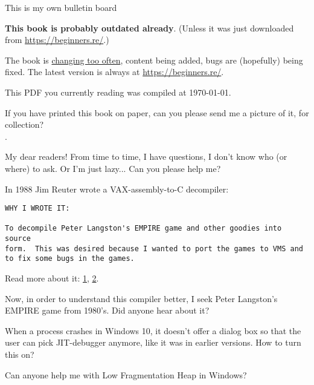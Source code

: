 
\begin{center}
\LARGE{} This is my own bulletin board \normalsize{}
\end{center}

\textbf{This book is probably outdated already}.
(Unless it was just downloaded from \url{https://beginners.re/}.)

The book is \href{\RepoURL/ChangeLog}{changing too often},
content being added, bugs are (hopefully) being fixed.
The latest version is always at \url{https://beginners.re/}.

This PDF you currently reading was compiled at \today{}.

\myhrule{}

If you have printed this book on paper, can you please send me a picture of it, for collection?\\
\EMAILS{}.

\myhrule{}

My dear readers! From time to time, I have questions, I don't know who (or where) to ask.
Or I'm just lazy...
Can you please help me?

\myhrule{}

In 1988 Jim Reuter wrote a VAX-assembly-to-C decompiler:

\begin{lstlisting}
WHY I WROTE IT:

To decompile Peter Langston's EMPIRE game and other goodies into source
form.  This was desired because I wanted to port the games to VMS and
to fix some bugs in the games.
\end{lstlisting}

Read more about it:
\href{http://www.program-transformation.org/Transform/DecompReadMe}{1},
\href{http://www.program-transformation.org/Transform/DecompDecompiler}{2}.

Now, in order to understand this compiler better, I seek Peter Langston's EMPIRE game from 1980's.
Did anyone hear about it?

\myhrule{}

When a process crashes in Windows 10, it doesn't offer a dialog box so that the user can pick JIT-debugger anymore,
like it was in earlier versions.
How to turn this on?

\myhrule{}

Can anyone help me with Low Fragmentation Heap in Windows?

\myhrule{}

